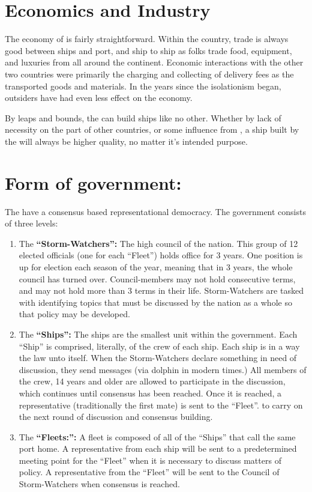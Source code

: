 \documentclass[blue]{GL2020}
\begin{document}
\name{\bVikings{}}

\section{Economics and Industry}
The economy of \pShip{} is fairly straightforward. Within the country, trade is always good between ships and port, and ship to ship as folks trade food, equipment, and luxuries from all around the continent. Economic interactions with the other two countries were primarily the charging and collecting of delivery fees as the \pVikings{} transported goods and materials. In the years since the isolationism began, outsiders have had even less effect on the economy.

By leaps and bounds, the \pVikings{} can build ships like no other. Whether by lack of necessity on the part of other countries, or some influence from \cSeaGoddess{}, a ship built by the \pViking{} will always be higher quality, no matter it's intended purpose.

\section{Form of government:} The \pVikings{} have a consensus based representational democracy. The government consists of three levels:

\begin{enumerate}
	\item The {\bf``Storm-Watchers'':} The high council of the \pShip{} nation. This group of 12 elected officials (one for each ``Fleet'') holds office for 3 years. One position is up for election each season of the year, meaning that in 3 years, the whole council has turned over. Council-members may not hold consecutive terms, and may not hold more than 3 terms in their life. Storm-Watchers are tasked with identifying topics that must be discussed by the nation as a whole so that policy may be developed.
	\item The {\bf``Ships'':} The ships are the smallest unit within the \pShip{} government. Each ``Ship'' is comprised, literally, of the crew of each ship. Each ship is in a way the law unto itself. When the Storm-Watchers declare something in need of discussion, they send messages (via dolphin in modern times.) All members of the crew, 14 years and older are allowed to participate in the discussion, which continues until consensus has been reached. Once it is reached, a representative (traditionally the first mate) is sent to the ``Fleet''. to carry on the next round of discussion and consensus building.
		\item The {\bf``Fleets:'':} A fleet is composed of all of the ``Ships'' that call the same port home. A representative from each ship will be sent to a predetermined meeting point for the ``Fleet'' when it is necessary to discuss matters of policy. A representative from the ``Fleet'' will be sent to the Council of Storm-Watchers when consensus is reached.
\end{enumerate}
\end{document}
